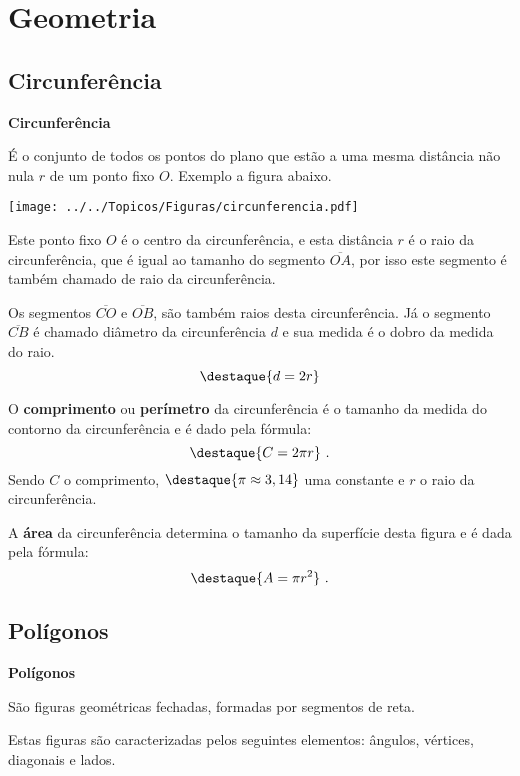 \chapter{Geometria}
\section{Circunferência}

\vskip0.3cm

\colorbox{azul}{
 \begin{minipage}{14.5cm}
 \begin{center}
 \textbf{Circunferência}
 
  É o conjunto de todos os pontos do plano que estão a uma mesma distância não nula $r$ de um ponto fixo $O$. Exemplo a figura abaixo.
 \end{center}
 \end{minipage}}
 
 \vskip0.3cm
 
 \begin{center}
 \texttt{[image: ../../Topicos/Figuras/circunferencia.pdf]}
 \end{center}
 
Este ponto fixo $O$ é o centro da circunferência, e esta distância $r$ é o raio da circunferência, que é igual ao tamanho do segmento $\overline{OA}$, por isso este segmento é também chamado de raio da circunferência.

Os segmentos $\overline{CO}$ e $\overline{OB}$, são também raios desta circunferência. Já o segmento $\overline{CB}$ é chamado diâmetro da circunferência $d$ e sua medida é o dobro da medida do raio.
\[\destaque{d= 2r}\]

O \textbf{comprimento} ou \textbf{perímetro} da circunferência é o tamanho da medida do contorno da circunferência e é dado pela fórmula:
\[\destaque{C= 2 \pi r} \ .\]
Sendo $C$ o comprimento, $\destaque{\pi \approx 3,14}$ uma constante e $r$ o raio da circunferência.

A \textbf{área} da circunferência determina o tamanho da superfície desta figura e é dada pela fórmula:
\[\destaque{A= \pi r^2} \ .\]


\section{Polígonos}

\vskip0.3cm

\colorbox{azul}{
 \begin{minipage}{14.5cm}
 \begin{center}
 \textbf{Polígonos}
 
  São figuras geométricas fechadas, formadas por segmentos de reta. 
  
  Estas figuras são caracterizadas pelos seguintes elementos: ângulos, vértices, diagonais e lados. 
 \end{center}
 \end{minipage}}
 
